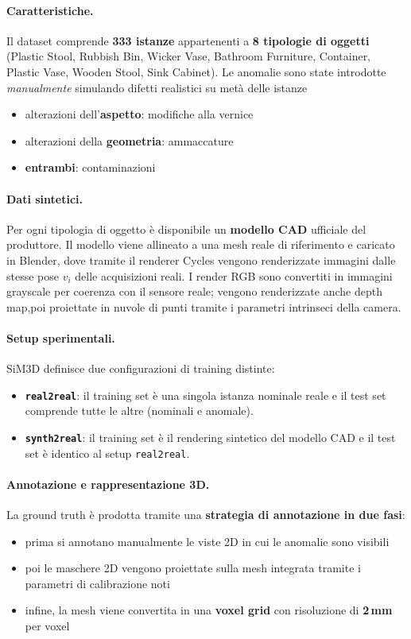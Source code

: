 \paragraph{Caratteristiche.}
Il dataset comprende \textbf{333 istanze} appartenenti a \textbf{8 tipologie di oggetti} (Plastic Stool, Rubbish Bin, Wicker Vase, Bathroom Furniture, Container, Plastic Vase, Wooden Stool, Sink Cabinet). Le anomalie sono state introdotte \textit{manualmente} simulando difetti realistici su metà delle istanze
\begin{itemize}
    \item alterazioni dell'\textbf{aspetto}: modifiche alla vernice
    \item alterazioni della \textbf{geometria}: ammaccature
    \item \textbf{entrambi}: contaminazioni
\end{itemize}

\paragraph{Dati sintetici.}
Per ogni tipologia di oggetto è disponibile un \textbf{modello CAD} ufficiale del produttore. Il modello viene allineato a una mesh reale di riferimento e caricato in Blender, dove tramite il renderer Cycles vengono renderizzate immagini dalle stesse pose $v_i$ delle acquisizioni reali. I render RGB sono convertiti in immagini grayscale per coerenza con il sensore reale; vengono renderizzate anche depth map,poi proiettate in nuvole di punti tramite i parametri intrinseci della camera.


\paragraph{Setup sperimentali.}
SiM3D definisce due configurazioni di training distinte:
\begin{itemize}
    \item \textbf{\texttt{real2real}}: il training set è una singola istanza nominale reale e il test set comprende tutte le altre (nominali e anomale).
    \item \textbf{\texttt{synth2real}}: il training set è il rendering sintetico del modello CAD e il test set è identico al setup \texttt{real2real}.
\end{itemize}

\paragraph{Annotazione e rappresentazione 3D.}
La ground truth è prodotta tramite una \textbf{strategia di annotazione in due fasi}: 
\begin{itemize}
    \item prima si annotano manualmente le viste 2D in cui le anomalie sono visibili
    \item poi le maschere 2D vengono proiettate sulla mesh integrata tramite i parametri di calibrazione noti
    \item infine, la mesh viene convertita in una \textbf{voxel grid} con risoluzione di \textbf{2\,mm} per voxel
\end{itemize}

